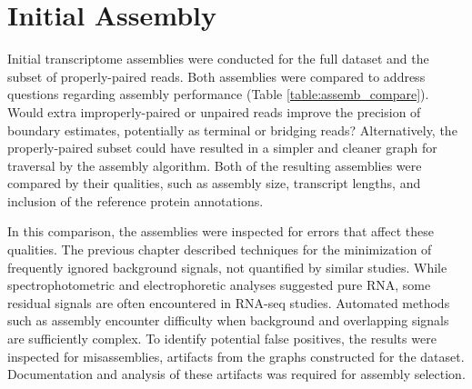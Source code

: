 
\section{Initial Assembly}

Initial transcriptome assemblies were conducted for the full dataset and the subset of properly-paired reads. Both assemblies were compared to address questions regarding assembly performance (Table \ref{table:assemb_compare}). Would extra improperly-paired or unpaired reads improve the precision of boundary estimates, potentially as terminal or bridging reads? Alternatively, the properly-paired subset could have resulted in a simpler and cleaner graph for traversal by the assembly algorithm. Both of the resulting assemblies were compared by their qualities, such as assembly size, transcript lengths, and inclusion of the reference protein annotations. 

In this comparison, the assemblies were inspected for errors that affect these qualities. The previous chapter described techniques for the minimization of frequently ignored background signals, not quantified by similar studies. While spectrophotometric and electrophoretic analyses suggested pure RNA, some residual signals are often encountered in RNA-seq studies.\cite{176} Automated methods such as assembly encounter difficulty when background and overlapping signals are sufficiently complex. To identify potential false positives, the results were inspected for misassemblies, artifacts from the graphs constructed for the dataset. Documentation and analysis of these artifacts was required for assembly selection.

